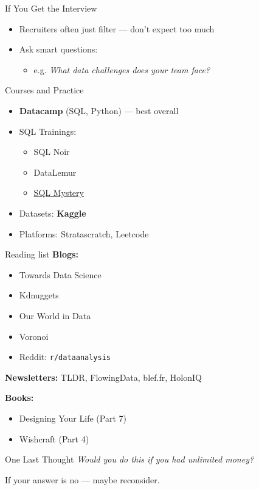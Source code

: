 \documentclass[10pt,a4paper]{article}
\begin{document}
\begin{multicols}{3}
\begin{textboxGreen}{If You Get the Interview}
\begin{itemize}
    \item Recruiters often just filter — don't expect too much
    \item Ask smart questions:
    \begin{itemize}
        \item e.g. \emph{What data challenges does your team face?}
    \end{itemize}
\end{itemize}
\end{textboxGreen}


\begin{textboxGray}{Courses and Practice}
\begin{itemize}
    \item \textbf{Datacamp} (SQL, Python) — best overall
    \item SQL Trainings:
    \begin{itemize}
        \item SQL Noir
        \item DataLemur
        \item \href{https://mystery.knightlab.com/}{SQL Mystery}
    \end{itemize}
    \item Datasets: \textbf{Kaggle}
    \item Platforms: Stratascratch, Leetcode
\end{itemize}
\end{textboxGray}

\begin{textboxYellow}{Reading list}
\textbf{Blogs:}
\begin{itemize}
    \item Towards Data Science
    \item Kdnuggets
    \item Our World in Data
    \item Voronoi
    \item Reddit: \texttt{r/dataanalysis}
\end{itemize}
\textbf{Newsletters:} TLDR, FlowingData, blef.fr, HolonIQ

\textbf{Books:}
\begin{itemize}
    \item Designing Your Life (Part 7)
    \item Wishcraft (Part 4)
\end{itemize}
\end{textboxYellow}

\begin{textbox}{One Last Thought}
\emph{Would you do this if you had unlimited money?}

If your answer is no — maybe reconsider.
\end{textbox}
\date{\today}
\end{multicols}
\end{document}
